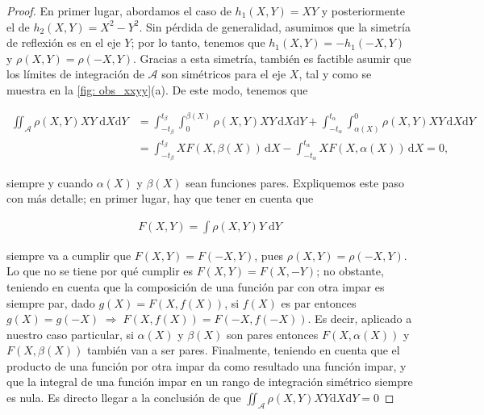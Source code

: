 \begin{proof}
En primer lugar, abordamos el caso de $h_1(X,Y) = XY$ y posteriormente el de $h_2(X,Y) = X^2 - Y^2$. Sin pérdida de generalidad, asumimos que la simetría de reflexión es en el eje $Y$; por lo tanto, tenemos que $h_1(X,Y) = -h_1(-X,Y)$ y $\rho(X,Y) = \rho(-X,Y)$. Gracias a esta simetría, también es factible asumir que los límites de integración de $\mathcal{A}$ son simétricos para el eje $X$, tal y como se muestra en la \autoref{fig: obs_xxyy}(a). De este modo, tenemos que

\begin{align*}
\iint_{\mathcal{A}} \rho(X,Y) XY \; \mathrm{d}X \mathrm{d}Y 
&= 
\int_{-t_\beta}^{t_\beta}\int_{0}^{\beta(X)} \rho(X,Y) XY \, \mathrm{d}X  \mathrm{d}Y
+
\int_{-t_\alpha}^{t_\alpha}\int_{\alpha(X)}^{0} \rho(X,Y) XY \, \mathrm{d}X \mathrm{d}Y
\\ & = 
\int_{-t_\beta}^{t_\beta} X F(X,\beta(X)) \, \mathrm{d}X
-
\int_{-t_\alpha}^{t_\alpha} X F(X,\alpha(X)) \, \mathrm{d}X = 0,
\end{align*}

siempre y cuando $\alpha(X)$ y $\beta(X)$ sean funciones pares. Expliquemos este paso con más detalle; en primer lugar, hay que tener en cuenta que

\begin{align*}
F(X,Y) = \int \rho(X,Y) Y \; \mathrm{d}Y 
\end{align*}

siempre va a cumplir que $F(X,Y) = F(-X,Y)$, pues $\rho(X,Y) = \rho(-X,Y)$. Lo que no se tiene por qué cumplir es $F(X,Y) = F(X,-Y)$; no obstante, teniendo en cuenta que la composición de una función par con otra impar es siempre par, dado $g(X) = F(X,f(X))$, si $f(X)$ es par entonces $g(X) = g(-X) \; \Longrightarrow \; F(X,f(X)) = F(-X,f(-X))$. Es decir, aplicado a nuestro caso particular, si $\alpha(X)$ y $\beta(X)$ son pares entonces $F(X,\alpha(X))$ y $F(X,\beta(X))$ también van a ser pares. Finalmente, teniendo en cuenta que el producto de una función por otra impar da como resultado una función impar, y que la integral de una función impar en un rango de integración simétrico siempre es nula. Es directo llegar a la conclusión de que $\iint_\mathcal{A} \rho(X,Y)XY \mathrm{d}X\mathrm{d}Y = 0$

\newpage


\end{proof}
